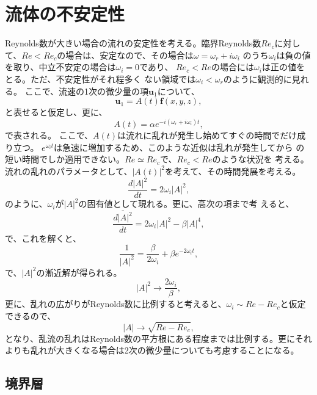 \chapter{流体の不安定性}
Reynolds数が大きい場合の流れの安定性を考える。臨界Reynolds数$Re_c$に対し
て、$Re<Re_c$の場合は、安定なので、その場合は$\omega=\omega_r+i\omega_i$
のうち$\omega_i$は負の値を取り、中立不安定の場合は$\omega_i=0$であり、
$Re_c<Re$の場合には$\omega_i$は正の値をとる。ただ、不安定性がそれ程多く
ない領域では$\omega_i<\omega_r$のように観測的に見れる。
ここで、流速の1次の微少量の項$\bm{u}_1$について、
\begin{equation}
 \bm{u}_1 = A(t)\bm{f}(x,y,z),
\end{equation}
と表せると仮定し、更に、
\begin{equation}
 A(t) = \alpha e^{-i(\omega_r + i\omega_i)t},
\end{equation}
で表される。
ここで、$A(t)$は流れに乱れが発生し始めてすぐの時間でだけ成り立つ。
$e^{\omega_it}$は急速に増加するため、このような近似は乱れが発生してから
の短い時間でしか適用できない。$Re\simeq Re_c$で、$Re_c<Re$のような状況を
考える。
流れの乱れのパラメータとして、$|A(t)|^2$を考えて、その時間発展を考える。
\begin{equation}
 \frac{d|A|^2}{dt} = 2\omega_i |A|^2,
\end{equation}
のように、$\omega_i$が$|A|^2$の固有値として現れる。更に、高次の項まで考
えると、
\begin{equation}
  \overline{\frac{d|A|^2}{dt}} = 2\omega_i |A|^2 - \beta |A|^4,
\end{equation}
で、これを解くと、
\begin{equation}
 \frac{1}{|A|^2} = \frac{\beta}{2\omega_i} + \beta e^{-2\omega_it} ,
\end{equation}
で、$|A|^2$の漸近解が得られる。
\begin{equation}
 |A|^2\rightarrow\frac{2\omega_i}{\beta},
\end{equation}
更に、乱れの広がりがReynolds数に比例すると考えると、$\omega_i\sim
Re-Re_c$と仮定できるので、
\begin{equation}
 |A|\rightarrow \sqrt{Re-Re_c},
\end{equation}
となり、乱流の乱れはReynolds数の平方根にある程度までは比例する。更にそれ
よりも乱れが大きくなる場合は2次の微少量についても考慮することになる。

\section{境界層}
